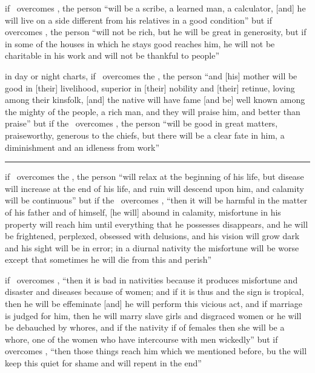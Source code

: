 \begin{description}[style=multiline,leftmargin=1.5cm]
\item[\Jupiter\Square\Mercury] if \Jupiter\, overcomes \Mercury, the person ``will be a scribe, a learned man, a calculator, [and] he will live on a side different from his relatives in a good condition'' but if \Mercury\, overcomes \Jupiter, the person ``will not be rich, but he will be great in generosity, but if in some of the houses in which he stays good reaches him, he will not be charitable in his work and will not be thankful to people''

\item[\Jupiter\Square\Moon] in day or night charts, if \Jupiter\, overcomes the \Moon, the person ``and [his] mother will be good in [their] livelihood, superior in [their] nobility and [their] retinue, loving among their kinsfolk, [and] the native will have fame [and be] well known among the mighty of the people, a rich man, and they will praise him, and better than praise'' but if the \Moon\, overcomes \Jupiter, the person ``will be good in great matters, praiseworthy, generous to the chiefs, but there will be a clear fate in him, a diminishment and an idleness from work''

\vspace{0.5em}\hrule
\item[\Mars\Square\Sun] if \Mars\, overcomes the \Sun, the person ``will relax at the beginning of his life, but disease will increase at the end of his life, and ruin will descend upon him, and calamity will be continuous'' but if the \Sun\, overcomes \Mars, ``then it will be harmful in the matter of his father and of himself, [he will] abound in calamity, misfortune in his property will reach him until everything that he possesses disappears, and he will be frightened, perplexed, obsessed with delusions, and his vision will grow dark and his sight will be in error; in a diurnal nativity the misfortune will be worse except that sometimes he will die from this and perish''

\item[\Mars\Square\Venus] if \Mars\, overcomes \Venus, ``then it is bad in nativities because it produces misfortune and disaster and diseases because of women; and if it is thus and the sign is tropical, then he will be effeminate [and] he will perform this vicious act, and if marriage is judged for him, then he will marry slave girls and disgraced women or he will be debauched by whores, and if the nativity if of females then she will be a whore, one of the women who have intercourse with men wickedly'' but if \Venus\, overcomes \Mars, ``then those things reach him which we mentioned before, bu the will keep this quiet for shame and will repent in the end''


\end{description}
